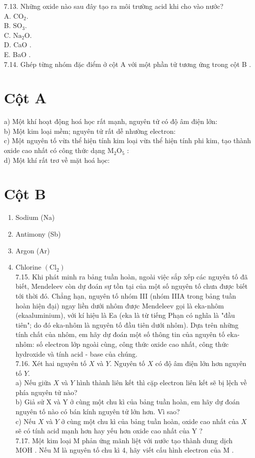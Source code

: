 \documentclass[10pt]{article}
\begin{document}
7.13. Những oxide nào sau đây tạo ra môi trường acid khi cho vào nước?\\
A. $\mathrm{CO}_{2}$.\\
B. $\mathrm{SO}_{3}$.\\
C. $\mathrm{Na}_{2} \mathrm{O}$.\\
D. CaO .\\
E. BaO .\\
7.14. Ghép từng nhóm đặc điểm ở cột A với một phần tử tương ứng trong cột B .

\section*{Cột A}
a) Một khí hoạt động hoá học rất mạnh, nguyên tử có độ âm điện lớn:\\
b) Một kim loại mềm; nguyên tử rất dễ nhường electron:\\
c) Một nguyên tố vừa thể hiện tính kim loại vừa thể hiện tính phi kim, tạo thành oxide cao nhất có công thức dạng $\mathrm{M}_{2} \mathrm{O}_{5}$ :\\
d) Một khí rất trơ về mặt hoá học:

\section*{Cột B}
\begin{enumerate}
  \item Sodium (Na)
  \item Antimony (Sb)
  \item Argon (Ar)
  \item Chlorine $\left(\mathrm{Cl}_{2}\right)$\\
7.15. Khi phát minh ra bảng tuần hoàn, ngoài việc sắp xếp các nguyên tố đã biết, Mendeleev còn dự đoán sự tồn tại của một số nguyên tố chưa được biết tới thời đó. Chẳng hạn, nguyên tố nhóm III (nhóm IIIA trong bảng tuần hoàn hiện đại) ngay liền dưới nhôm được Mendeleev gọi là eka-nhôm (ekaaluminium), với kí hiệu là Ea (eka là từ tiếng Phạn có nghĩa là "đầu tiên"; do đó eka-nhôm là nguyên tố đầu tiên dưới nhôm). Dựa trên những tính chất của nhôm, em hãy dự đoán một số thông tin của nguyên tố eka-nhôm: số electron lớp ngoài cùng, công thức oxide cao nhất, công thức hydroxide và tính acid - base của chúng.\\
7.16. Xét hai nguyên tố $X$ và $Y$. Nguyên tố $X$ có độ âm điện lớn hơn nguyên tố $Y$.\\
a) Nếu giữa $X$ và $Y$ hình thành liên kết thì cặp electron liên kết sẽ bị lệch về phía nguyên tử nào?\\
b) Giả sử X và Y ở cùng một chu kì của bảng tuần hoàn, em hãy dự đoán nguyên tố nào có bán kính nguyên tử lớn hơn. Vì sao?\\
c) Nếu $X$ và $Y$ ở cùng một chu kì của bảng tuần hoàn, oxide cao nhất của $X$ sẽ có tính acid mạnh hơn hay yếu hơn oxide cao nhất của Y ?\\
7.17. Một kim loại M phản ứng mãnh liệt với nước tạo thành dung dịch MOH . Nếu M là nguyên tố chu kì 4, hãy viết cấu hình electron của M .
\end{enumerate}
\end{document}
